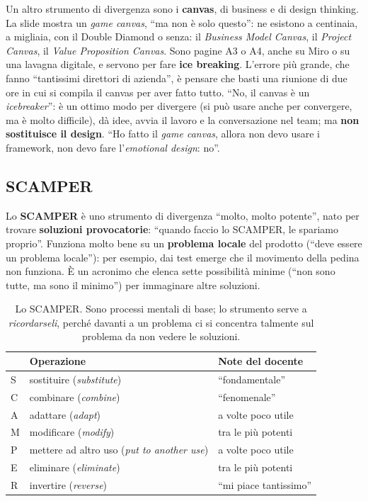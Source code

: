 Un altro strumento di divergenza sono i \textbf{canvas}, di business e di design thinking.
La slide mostra un \emph{game canvas}, ``ma non è solo questo'': ne esistono a centinaia,
a migliaia, con il Double Diamond o senza: il \emph{Business Model Canvas}, il
\emph{Project Canvas}, il \emph{Value Proposition Canvas}. Sono pagine A3 o A4, anche su
Miro o su una lavagna digitale, e servono per fare \textbf{ice breaking}. L'errore più grande,
che fanno ``tantissimi direttori di azienda'', è pensare che basti una riunione di due ore
in cui si compila il canvas per aver fatto tutto. ``No, il canvas è un \emph{icebreaker}'':
è un ottimo modo per divergere (si può usare anche per convergere, ma è molto difficile),
dà idee, avvia il lavoro e la conversazione nel team; ma \textbf{non sostituisce il
design}. ``Ho fatto il \emph{game canvas}, allora non devo usare i framework, non devo fare
l'\emph{emotional design}: no''.

\subsection{SCAMPER}



Lo \textbf{SCAMPER} è uno strumento di divergenza ``molto, molto potente'', nato per
trovare \textbf{soluzioni provocatorie}: ``quando faccio lo SCAMPER, le spariamo
proprio''. Funziona molto bene su un \textbf{problema locale} del prodotto (``deve essere
un problema locale''): per esempio, dai test emerge che il movimento della pedina non
funziona. È un acronimo che elenca sette possibilità minime (``non sono tutte, ma sono il
minimo'') per immaginare altre soluzioni.

\begin{table}[htbp]
\centering
\small
\begin{tabular}{@{}p{0.6cm}p{3.6cm}p{8.6cm}@{}}
\toprule
 & \textbf{Operazione} & \textbf{Note del docente} \\
\midrule
S & sostituire (\emph{substitute}) & ``fondamentale'' \\
C & combinare (\emph{combine}) & ``fenomenale'' \\
A & adattare (\emph{adapt}) & a volte poco utile \\
M & modificare (\emph{modify}) & tra le più potenti \\
P & mettere ad altro uso (\emph{put to another use}) & a volte poco utile \\
E & eliminare (\emph{eliminate}) & tra le più potenti \\
R & invertire (\emph{reverse}) & ``mi piace tantissimo'' \\
\bottomrule
\end{tabular}
\caption{Lo SCAMPER. Sono processi mentali di base; lo strumento serve a
\emph{ricordarseli}, perché davanti a un problema ci si concentra talmente sul problema da
non vedere le soluzioni.}
\label{a5:tab:scamper}
\end{table}

